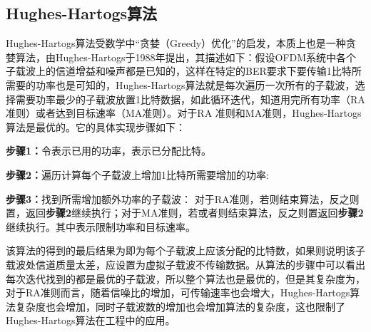 \subsection{Hughes-Hartogs算法}
Hughes-Hartogs算法\cite{hughes1989ensemble}受数学中“贪婪（Greedy）优化”的启发，本质上也是一种贪婪算法，由Hughes-Hartogs于1988年提出，其描述如下：假设OFDM系统中各个子载波上的信道增益和噪声都是已知的，这样在特定的BER要求下要传输1比特所需要的功率也是可知的，Hughes-Hartogs算法就是每次遍历一次所有的子载波，选择需要功率最少的子载波放置1比特数据，如此循环迭代，知道用完所有功率（RA准则）或者达到目标速率（MA准则）。对于RA 准则和MA准则，Hughes-Hartogs算法是最优的。它的具体实现步骤如下：
\begin{description}
\item{\bf{步骤1：}}令表示已用的功率，表示已分配比特。
\item{\bf{步骤2：}}遍历计算每个子载波上增加1比特所需要增加的功率:
\item{\bf{步骤3：}}找到所需增加额外功率的子载波：
对于RA准则，若则结束算法，反之则置，返回\textbf{步骤2}继续执行；对于MA准则，若或者则结束算法，反之则置返回\textbf{步骤2} 继续执行。其中表示限制功率和目标速率。
\end{description}
该算法的得到的最后结果为即为每个子载波上应该分配的比特数，如果则说明该子载波处信道质量太差，应设置为虚拟子载波不传输数据。从算法的步骤中可以看出每次迭代找到的都是最优的子载波，所以整个算法也是最优的，但是其复杂度为，对于RA准则而言，随着信噪比的增加，可传输速率也会增大，Hughes-Hartogs算法复杂度也会增加，同时子载波数的增加也会增加算法的复杂度，这也限制了Hughes-Hartogs算法在工程中的应用。
